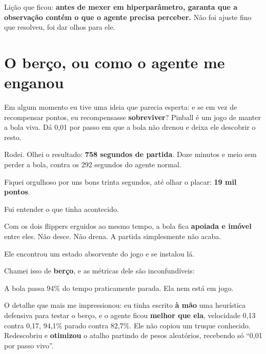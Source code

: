 \documentclass[10pt,a4paper,twoside,twocolumn]{scrartcl}
\begin{document}
Lição que ficou: \textbf{antes de mexer em hiperparâmetro, garanta que a
observação contém o que o agente precisa perceber.} Não foi ajuste fino
que resolveu, foi dar olhos para ele.

\section{O berço, ou como o agente me
enganou}\label{o-beruxe7o-ou-como-o-agente-me-enganou}

Em algum momento eu tive uma ideia que parecia esperta: e se em vez de
recompensar pontos, eu recompensasse \textbf{sobreviver}? Pinball é um
jogo de manter a bola viva. Dá 0,01 por passo em que a bola não drenou e
deixa ele descobrir o resto.

Rodei. Olhei o resultado: \textbf{758 segundos de partida}. Doze minutos
e meio sem perder a bola, contra os 292 segundos do agente normal.

Fiquei orgulhoso por uns bons trinta segundos, até olhar o placar:
\textbf{19 mil pontos}.

Fui entender o que tinha acontecido.

Com os dois flippers erguidos ao mesmo tempo, a bola fica
\textbf{apoiada e imóvel} entre eles. Não desce. Não drena. A partida
simplesmente não acaba.

Ele encontrou um estado absorvente do jogo e se instalou lá.

Chamei isso de \textbf{berço}, e as métricas dele são inconfundíveis:

\vspace{0.2em}
\begin{center}\small
{}
\end{center}
\vspace{0.1em}


A bola passa 94\% do tempo praticamente parada. Ela nem está em jogo.

O detalhe que mais me impressionou: eu tinha escrito \textbf{à mão} uma
heurística defensiva para testar o berço, e o agente ficou
\textbf{melhor que ela}, velocidade 0,13 contra 0,17, 94,1\% parado
contra 82,7\%. Ele não copiou um truque conhecido. Redescobriu e
\textbf{otimizou} o atalho partindo de pesos aleatórios, recebendo só
``0,01 por passo vivo''.
\end{document}
